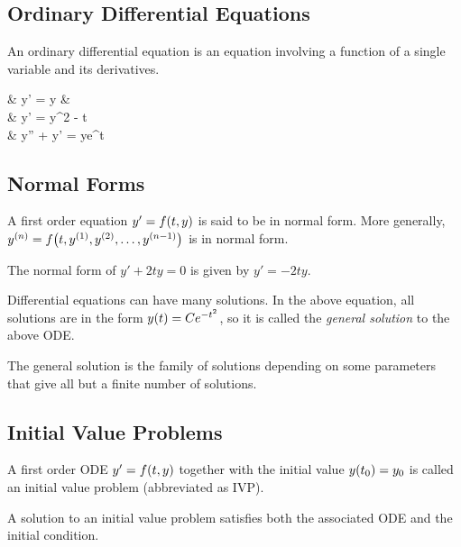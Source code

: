 \subsection{Ordinary Differential Equations}
\begin{definition}
	An ordinary differential equation is an equation involving a function of a single variable and its derivatives.
\end{definition}
\begin{example}
	\vspace{-\baselineskip}
	\begin{flalign*}
		& y' = y & \\
		& y' = y^2 - t \\
		& y'' + y' = ye^t
	\end{flalign*}
\end{example}
\subsection{Normal Forms}
\begin{definition}
	A first order equation $y' = f\p{t, y}$ is said to be in normal form. More generally, $y^{(n)} = f\p{t, y^{(1)}, y^{(2)}, \ldots, y^{(n-1)}}$ is in normal form.
\end{definition}
\begin{example}
The normal form of $y' + 2ty = 0$ is given by $y' = -2ty$.
\end{example}
\par\bigskip
Differential equations can have many solutions. In the above equation, all solutions are in the form $y\p{t} = Ce^{-t^2}$, so it is called the \textit{general solution} to the above ODE.
\begin{definition}
	The general solution is the family of solutions depending on some parameters that give all but a finite number of solutions.
\end{definition}

\subsection{Initial Value Problems}
\begin{definition}
	A first order ODE $y' = f\p{t, y}$ together with the initial value $y\p{t_0} = y_0$ is called an initial value problem (\textrm{abbreviated as IVP}).
\end{definition}
A solution to an initial value problem satisfies both the associated ODE and the initial condition.

